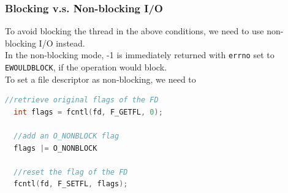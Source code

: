 \documentclass[aspectratio=43]{beamer}
\begin{document}
\begin{frame}[fragile]
  \frametitle{Blocking v.s. Non-blocking I/O}

\hspace*{2em} \begin{minipage}{.8\textwidth}
To avoid blocking the thread in the above conditions, we need to use non-blocking I/O instead.\\[1em]
In the non-blocking mode, -1 is immediately returned with {\tt errno} set to {\tt EWOULDBLOCK}, if the operation would block.\\[1em]
To set a file descriptor as non-blocking, we need to 
  \begin{lstlisting}[language=C++,basicstyle=\ttfamily\footnotesize,commentstyle=\color{commgreen},keywordstyle=\color{blue},breaklines=true]
  //retrieve original flags of the FD
  int flags = fcntl(fd, F_GETFL, 0);
  
  //add an O_NONBLOCK flag
  flags |= O_NONBLOCK
  
  //reset the flag of the FD
  fcntl(fd, F_SETFL, flags);
  \end{lstlisting}

\end{minipage}
\end{frame}
\end{document}

